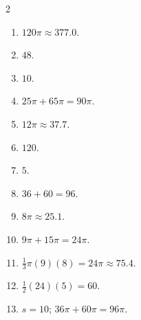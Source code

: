 \documentclass[11pt]{article}
\begin{document}
\begin{keybox}
\begin{multicols}{2}
\small
\begin{enumerate}[leftmargin=*,itemsep=3pt]
  \item $120\pi\approx377.0$.
  \item $48$.
  \item $10$.
  \item $25\pi+65\pi=90\pi$.
  \item $12\pi\approx37.7$.
  \item $120$.
  \item $5$.
  \item $36+60=96$.
  \item $8\pi\approx25.1$.
  \item $9\pi+15\pi=24\pi$.
  \item $\tfrac13\pi(9)(8)=24\pi\approx75.4$.
  \item $\tfrac12(24)(5)=60$.
  \item $s=10$; $36\pi+60\pi=96\pi$.
\end{enumerate}
\end{multicols}
\end{keybox}
\end{document}
